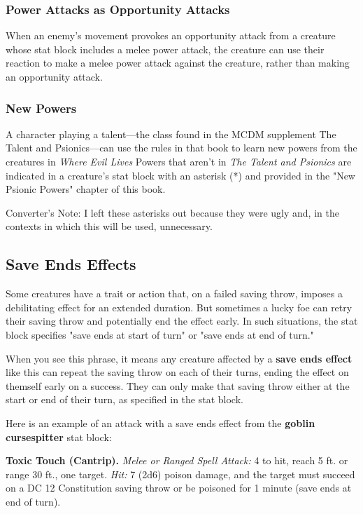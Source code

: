 \documentclass[10pt,a4paper,twoside,bg=print,twocolumn,openany,nodeprecatedcode]{dndbook}
\begin{document}
\subsubsection{Power Attacks as Opportunity Attacks}
When an enemy's movement provokes an opportunity attack from a creature whose stat block includes a melee power attack, the creature can use their reaction to make a melee power attack against the creature, rather than making an opportunity attack.

\subsubsection{New Powers}
A character playing a talent—the class found in the MCDM supplement The Talent and Psionics—can use the rules in that book to learn new powers from the creatures in \textit{Where Evil Lives} Powers that aren't in \textit{The Talent and Psionics} are indicated in a creature's stat block with an asterisk (*) and provided in the "New Psionic Powers" chapter of this book.

Converter's Note: I left these asterisks out because they were ugly and, in the contexts in which this will be used, unnecessary.

\subsection{Save Ends Effects}
Some creatures have a trait or action that, on a failed saving throw, imposes a debilitating effect for an extended duration. But sometimes a lucky foe can retry their saving throw and potentially end the effect early. In such situations, the stat block specifies "save ends at start of turn" or "save ends at end of turn."

When you see this phrase, it means any creature affected by a \textbf{save ends effect} like this can repeat the saving throw on each of their turns, ending the effect on themself early on a success. They can only make that saving throw either at the start or end of their turn, as specified in the stat block.

Here is an example of an attack with a save ends effect from the \textbf{goblin cursespitter} stat block:

\textbf{Toxic Touch (Cantrip).} \textsl{Melee or Ranged Spell Attack:} 4 to hit, reach 5 ft. or range 30 ft., one target. \textsl{Hit:} 7 (2d6) poison damage, and the target must succeed on a DC 12 Constitution saving throw or be poisoned for 1 minute (save ends at end of turn).
\end{document}
